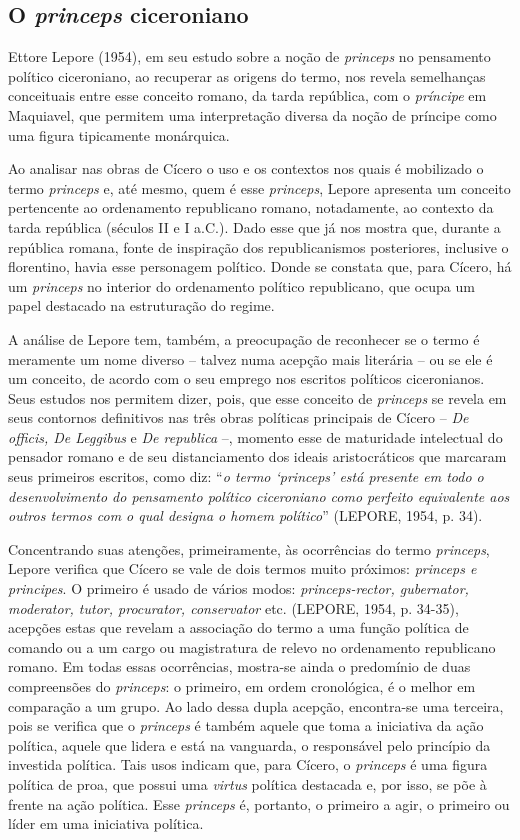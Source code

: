 \subsection{O \emph{princeps} ciceroniano}

Ettore Lepore (1954), em seu estudo sobre a noção de \emph{princeps} no
pensamento político ciceroniano, ao recuperar as origens do termo, nos
revela semelhanças conceituais entre esse conceito romano, da tarda
república, com o \emph{príncipe} em Maquiavel, que permitem uma
interpretação diversa da noção de príncipe como uma figura tipicamente
monárquica.

Ao analisar nas obras de Cícero o uso e os contextos nos quais é
mobilizado o termo \emph{princeps} e, até mesmo, quem é esse
\emph{princeps}, Lepore apresenta um conceito pertencente ao ordenamento
republicano romano, notadamente, ao contexto da tarda república (séculos
II e I a.C.). Dado esse que já nos mostra que, durante a república
romana, fonte de inspiração dos republicanismos posteriores, inclusive o
florentino, havia esse personagem político. Donde se constata que, para
Cícero, há um \emph{princeps} no interior do ordenamento político
republicano, que ocupa um papel destacado na estruturação do regime.

A análise de Lepore tem, também, a preocupação de reconhecer se o termo
é meramente um nome diverso -- talvez numa acepção mais literária -- ou
se ele é um conceito, de acordo com o seu emprego nos escritos políticos
ciceronianos. Seus estudos nos permitem dizer, pois, que esse conceito
de \emph{princeps} se revela em seus contornos definitivos nas três
obras políticas principais de Cícero -- \emph{De officis, De Leggibus} e
\emph{De republica} --, momento esse de maturidade intelectual do
pensador romano e de seu distanciamento dos ideais aristocráticos que
marcaram seus primeiros escritos, como diz: ``\emph{o termo `princeps'
está presente em todo o desenvolvimento do pensamento político
ciceroniano como perfeito equivalente aos outros termos com o qual
designa o homem político}'' (LEPORE, 1954, p. 34).

Concentrando suas atenções, primeiramente, às ocorrências do termo
\emph{princeps}, Lepore verifica que Cícero se vale de dois termos muito
próximos: \emph{princeps e principes}. O primeiro é usado de vários
modos: \emph{princeps-rector, gubernator, moderator, tutor, procurator,
conservator} etc. (LEPORE, 1954, p. 34-35), acepções estas que revelam a
associação do termo a uma função política de comando ou a um cargo ou
magistratura de relevo no ordenamento republicano romano. Em todas essas
ocorrências, mostra-se ainda o predomínio de duas compreensões do
\emph{princeps}: o primeiro, em ordem cronológica, é o melhor em
comparação a um grupo. Ao lado dessa dupla acepção, encontra-se uma
terceira, pois se verifica que o \emph{princeps} é também aquele que
toma a iniciativa da ação política, aquele que lidera e está na
vanguarda, o responsável pelo princípio da investida política. Tais usos
indicam que, para Cícero, o \emph{princeps} é uma figura política de
proa, que possui uma \emph{virtus} política destacada e, por isso, se
põe à frente na ação política. Esse \emph{princeps} é, portanto, o
primeiro a agir, o primeiro ou líder em uma iniciativa política.

